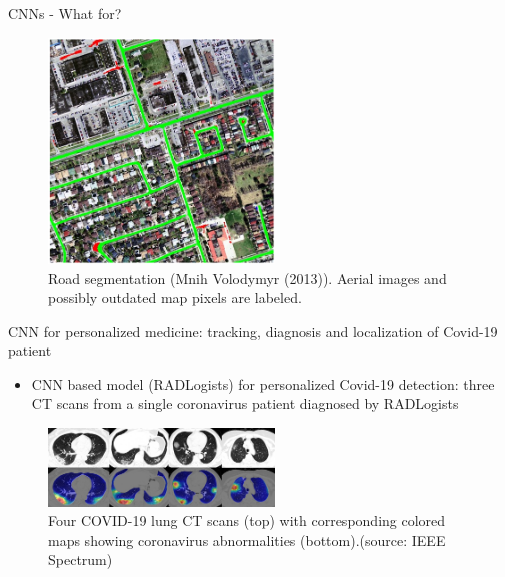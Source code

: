 \begin{vbframe}{CNNs - What for?}
  \begin{figure}
    \centering
    \includegraphics[width=6cm]{figure/road_seg.png}
    \caption{Road segmentation (Mnih Volodymyr (2013)). Aerial images and possibly outdated map pixels are labeled.}
  \end{figure}
\framebreak

\begin{figure}
  \centering
\end{figure}

{CNN for personalized medicine: tracking, diagnosis and localization of Covid-19 patient}
  \begin{itemize}
    \item CNN based model (RADLogists) for personalized Covid-19 detection: three CT scans from a single coronavirus patient diagnosed by RADLogists 
  \end{itemize}
  
   \begin{figure}
    \centering
    \includegraphics[width=6cm]{figure/hitmap.jpeg}
    \caption{Four COVID-19 lung CT scans (top) with corresponding colored maps showing coronavirus abnormalities (bottom).(source: IEEE Spectrum)}
  \end{figure}
\framebreak


\end{vbframe}
